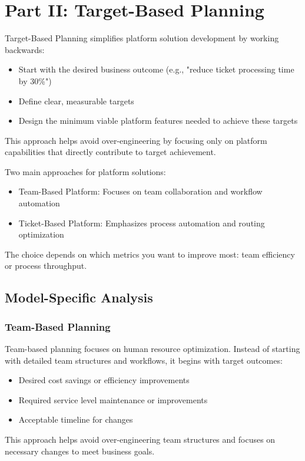 \documentclass[12pt,a4paper]{article}
\newenvironment{explanation}
{\begin{mdframed}[style=explanationstyle,frametitle={Explanation}]}
{\end{mdframed}}
\newenvironment{observation}
{\begin{mdframed}[style=observationstyle,frametitle={Observation}]}
{\end{mdframed}}
\begin{document}
\section{Part II: Target-Based Planning}

\begin{explanation}
Target-Based Planning simplifies platform solution development by working backwards:
\begin{itemize}
    \item Start with the desired business outcome (e.g., "reduce ticket processing time by 30\%")
    \item Define clear, measurable targets
    \item Design the minimum viable platform features needed to achieve these targets
\end{itemize}
This approach helps avoid over-engineering by focusing only on platform capabilities that directly contribute to target achievement.
\end{explanation}

\begin{observation}
Two main approaches for platform solutions:
\begin{itemize}
    \item Team-Based Platform: Focuses on team collaboration and workflow automation
    \item Ticket-Based Platform: Emphasizes process automation and routing optimization
\end{itemize}
The choice depends on which metrics you want to improve most: team efficiency or process throughput.
\end{observation}

\subsection{Model-Specific Analysis}

\subsubsection{Team-Based Planning}

\begin{explanation}
Team-based planning focuses on human resource optimization. Instead of starting with detailed team structures and workflows, it begins with target outcomes:
\begin{itemize}
    \item Desired cost savings or efficiency improvements
    \item Required service level maintenance or improvements
    \item Acceptable timeline for changes
\end{itemize}
This approach helps avoid over-engineering team structures and focuses on necessary changes to meet business goals.
\end{explanation}
\end{document}
